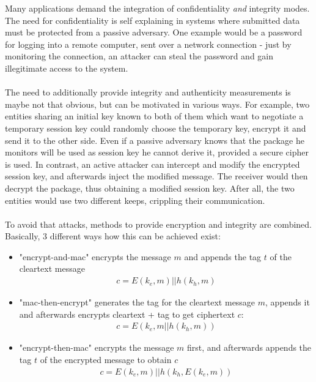 Many applications demand the integration of confidentiality \textit{and} integrity modes. The need for confidentiality is self explaining in systems where
submitted data must be protected from a passive adversary. One example would be a password for logging into a remote computer, sent over a network connection
- just by monitoring the connection, an attacker can steal the password and gain illegitimate access to the system.
\\
\\
The need to additionally provide integrity and authenticity measurements is maybe not that obvious, but can be motivated in various ways. For example, two entities
sharing an initial key known to both of them which want to negotiate a temporary session key could randomly choose the temporary key, encrypt it and send it
to the other side. Even if a passive adversary knows that the package he monitors will be used as session key he cannot derive it, provided a secure cipher is
used.  In contrast, an active attacker can intercept and modify the encrypted session key, and afterwards inject the modified message. The receiver
would then decrypt the package, thus obtaining a modified session key. After all, the two entities would use two different keeps, crippling their communication.
\\
\\
To avoid that attacks, methods to provide encryption and integrity are combined. Basically, 3 different ways how this can be achieved exist:
\begin{itemize}
 \item "encrypt-and-mac" encrypts the message $m$ and appends the tag $t$ of the cleartext message
 \begin{align}\label{encAndMac}
  c = E(k_e, m) || h(k_h, m)
 \end{align}
 \item "mac-then-encrypt" generates the tag for the cleartext message $m$, appends it and afterwards encrypts cleartext + tag to get ciphertext $c$:
 \begin{align}\label{macThenEnc}
  c = E(k_e, m || h(k_h, m))
 \end{align}
 \item "encrypt-then-mac" encrypts the message $m$ first, and afterwards appends the tag $t$ of the encrypted message to obtain $c$
 \begin{align}\label{encThenMac}
  c = E(k_e, m) || h(k_h, E(k_e, m))
 \end{align}
\end{itemize}
